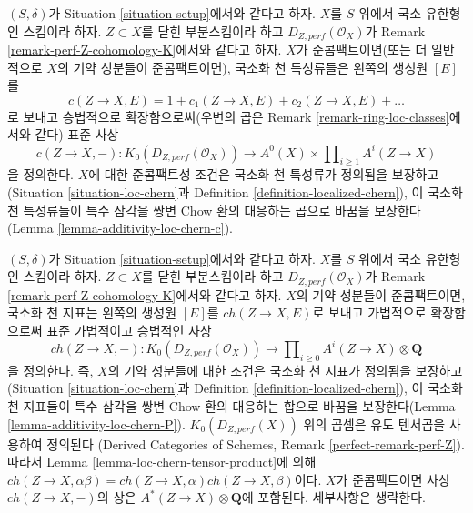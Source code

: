 \begin{remark}
\label{remark-localized-chern-classes-K}
$(S, \delta)$가 Situation \ref{situation-setup}에서와 같다고 하자.
$X$를 $S$ 위에서 국소 유한형인 스킴이라 하자. $Z \subset X$를 닫힌
부분스킴이라 하고 $D_{Z, perf}(\mathcal{O}_X)$가 Remark
\ref{remark-perf-Z-cohomology-K}에서와 같다고 하자. $X$가
준콤팩트이면(또는 더 일반적으로 $X$의 기약 성분들이 준콤팩트이면),
국소화 천 특성류들은 왼쪽의 생성원 $[E]$를
$$
c(Z \to X, E) = 1 + c_1(Z \to X, E) + c_2(Z \to X, E) + \ldots
$$
로 보내고 승법적으로 확장함으로써(우변의 곱은 Remark
\ref{remark-ring-loc-classes}에서와 같다) 표준 사상
$$
c(Z \to X, -) : K_0(D_{Z, perf}(\mathcal{O}_X)) \longrightarrow
A^0(X) \times \prod\nolimits_{i \geq 1} A^i(Z \to X)
$$
을 정의한다. $X$에 대한 준콤팩트성 조건은 국소화 천 특성류가
정의됨을 보장하고(Situation \ref{situation-loc-chern}과 Definition
\ref{definition-localized-chern}), 이 국소화 천 특성류들이 특수
삼각을 쌍변 Chow 환의 대응하는 곱으로 바꿈을 보장한다(Lemma
\ref{lemma-additivity-loc-chern-c}).
\end{remark}

\begin{remark}
\label{remark-localized-chern-character-K}
$(S, \delta)$가 Situation \ref{situation-setup}에서와 같다고 하자.
$X$를 $S$ 위에서 국소 유한형인 스킴이라 하자. $Z \subset X$를 닫힌
부분스킴이라 하고 $D_{Z, perf}(\mathcal{O}_X)$가 Remark
\ref{remark-perf-Z-cohomology-K}에서와 같다고 하자. $X$의 기약 성분들이
준콤팩트이면, 국소화 천 지표는 왼쪽의 생성원 $[E]$를
$ch(Z \to X, E)$로 보내고 가법적으로 확장함으로써 표준 가법적이고
승법적인 사상
$$
ch(Z \to X, -) : K_0(D_{Z, perf}(\mathcal{O}_X)) \longrightarrow
\prod\nolimits_{i \geq 0} A^i(Z \to X) \otimes \mathbf{Q}
$$
을 정의한다. 즉, $X$의 기약 성분들에 대한 조건은 국소화 천 지표가
정의됨을 보장하고(Situation \ref{situation-loc-chern}과 Definition
\ref{definition-localized-chern}), 이 국소화 천 지표들이 특수 삼각을
쌍변 Chow 환의 대응하는 합으로 바꿈을 보장한다(Lemma
\ref{lemma-additivity-loc-chern-P}).
$K_0(D_{Z, perf}(X))$ 위의 곱셈은 유도 텐서곱을 사용하여 정의된다
(Derived Categories of Schemes, Remark \ref{perfect-remark-perf-Z}).
따라서 Lemma \ref{lemma-loc-chern-tensor-product}에 의해
$ch(Z \to X, \alpha \beta) = ch(Z \to X, \alpha) ch(Z \to X, \beta)$이다.
$X$가 준콤팩트이면 사상 $ch(Z \to X, -)$의 상은
$A^*(Z \to X) \otimes \mathbf{Q}$에 포함된다. 세부사항은 생략한다.
\end{remark}

